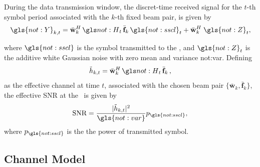 During the data transmission window, the discret-time received signal for the $t$-th symbol period associated with the $k$-th fixed beam pair, is given by
\begin{equation}
\label{eq.:amc-rx-signal}
	\gls{not:Y}_{k,t} =
    \bar{\mathbf{w}}^H_k \,
  \channel _t\,
   \bar{\mathbf{f}}_k \,
   \gls{not:sscl}_t
 +
  \bar{\mathbf{w}}^H_k \;
  \gls{not:Z}_t,
\end{equation}

\noindent where $\gls{not:sscl}$ is the symbol transmitted to the \ue, and $\gls{not:Z}_t$ is the additive white Gaussian noise with zero mean and variance \gls{not:var}.
%
%
Defining
\begin{equation}
  \tilde{h}_{k,t} =     \bar{\mathbf{w}}^H_k \,
  \channel _t\,
   \bar{\mathbf{f}}_k \, ,
\end{equation}
as the effective channel at time $t$, associated with the chosen beam pair $\{ \bar{\mathbf{w}}_k, \bar{\mathbf{f}}_k \}$, the effective SNR at the \ue \, is given by
%
\begin{equation}
    \label{eq.:amc-snr}
    \textrm{SNR} = \frac{ \abs{
     \tilde{h}_{k,t}
      }^2 }{\gls{not:var}} p_{\gls{not:sscl}},
\end{equation}
where $p_{\gls{not:sscl}}$ is the the power of transmitted symbol.
%
%


\subsection{Channel Model}

